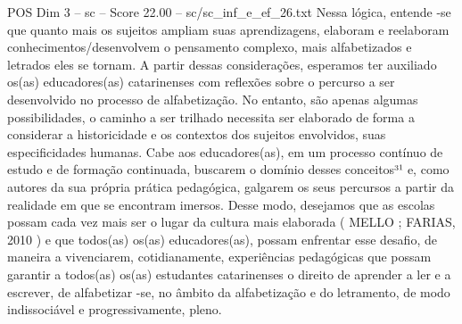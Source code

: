 \begin{textsample}{POS Dim 3 – sc – Score 22.00 – sc/sc\_inf\_e\_ef\_26.txt}
Nessa lógica, entende -se que quanto mais os sujeitos ampliam suas aprendizagens, elaboram e reelaboram conhecimentos/desenvolvem o pensamento complexo, mais alfabetizados e letrados eles se tornam.
A partir dessas considerações, esperamos ter auxiliado os(as) educadores(as) catarinenses com reflexões sobre o percurso a ser desenvolvido no processo de alfabetização.
No entanto, são apenas algumas possibilidades, o caminho a ser trilhado necessita ser elaborado de forma a considerar a historicidade e os contextos dos sujeitos envolvidos, suas especificidades humanas.
Cabe aos educadores(as), em um processo contínuo de estudo e de formação continuada, buscarem o domínio desses conceitos³¹ e, como autores da sua própria prática pedagógica, galgarem os seus percursos a partir da realidade em que se encontram imersos.
Desse modo, desejamos que as escolas possam cada vez mais ser o lugar da cultura mais elaborada ( MELLO ; FARIAS, 2010 ) e que todos(as) os(as) educadores(as), possam enfrentar esse desafio, de maneira a vivenciarem, cotidianamente, experiências pedagógicas que possam garantir a todos(as) os(as) estudantes catarinenses o direito de aprender a ler e a escrever, de alfabetizar -se, no âmbito da alfabetização e do letramento, de modo indissociável e progressivamente, pleno.

\end{textsample}
